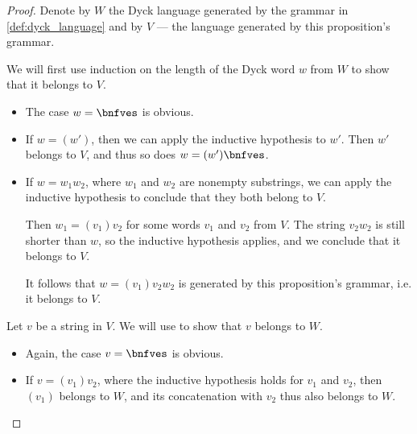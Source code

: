 \begin{proof}
  Denote by \( W \) the Dyck language generated by the grammar in \cref{def:dyck_language} and by \( V \) --- the language generated by this proposition's grammar.

   We will first use induction on the length of the Dyck word \( w \) from \( W \) to show that it belongs to \( V \).

  \begin{itemize}
    \item The case \( w = \bnfves \) is obvious.

    \item If \( w = (w') \), then we can apply the inductive hypothesis to \( w' \). Then \( w' \) belongs to \( V \), and thus so does \( w = (w')\bnfves \).

    \item If \( w = w_1 w_2 \), where \( w_1 \) and \( w_2 \) are nonempty substrings, we can apply the inductive hypothesis to conclude that they both belong to \( V \).

    Then \( w_1 = (v_1) v_2 \) for some words \( v_1 \) and \( v_2 \) from \( V \). The string \( v_2 w_2 \) is still shorter than \( w \), so the inductive hypothesis applies, and we conclude that it belongs to \( V \).

    It follows that \( w = (v_1) v_2 w_2 \) is generated by this proposition's grammar, i.e. it belongs to \( V \).
  \end{itemize}

   Let \( v \) be a string in \( V \). We will use  to show that \( v \) belongs to \( W \).

  \begin{itemize}
    \item Again, the case \( v = \bnfves \) is obvious.

    \item If \( v = (v_1) v_2 \), where the inductive hypothesis holds for \( v_1 \) and \( v_2 \), then \( (v_1) \) belongs to \( W \), and its concatenation with \( v_2 \) thus also belongs to \( W \).
  \end{itemize}
\end{proof}

